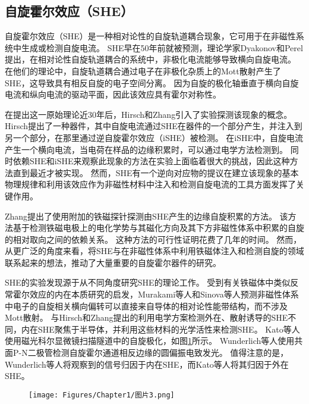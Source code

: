 \subsection{自旋霍尔效应（SHE）}
自旋霍尔效应（SHE）是一种相对论性的自旋轨道耦合现象，它可用于在非磁性系统中生成或检测自旋电流。
SHE早在50年前就被预测，理论学家Dyakonov\cite{dyakonov1971current}和Perel\cite{d1971possibility}提出，在相对论性自旋轨道耦合的系统中，非极化电流能够导致横向自旋电流。
在他们的理论中，自旋轨道耦合通过电子在非极化杂质上的Mott散射产生了SHE，这导致具有相反自旋的电子空间分离。
因为自旋的极化轴垂直于横向自旋电流和纵向电流的驱动平面，因此该效应具有霍尔对称性。\par
在提出这一原始理论近30年后，Hirsch\cite{hirsch1999spin}和Zhang\cite{zhang2000spin}引入了实验探测该现象的概念。
Hirsch提出了一种器件，其中自旋电流通过SHE在器件的一个部分产生，并注入到另一个部分，在那里通过逆自旋霍尔效应（iSHE）被检测。
在iSHE中，自旋电流产生一个横向电流，当电荷在样品的边缘积累时，可以通过电学方法检测到。
同时依赖SHE和iSHE来观察此现象的方法在实验上面临着很大的挑战，因此这种方法直到最近才被实现\cite{brune2010evidence}。
然而，SHE有一个逆向对应物的提议在建立该现象的基本物理规律和利用该效应作为非磁性材料中注入和检测自旋电流的工具方面发挥了关键作用。\par
Zhang提出了使用附加的铁磁探针探测由SHE产生的边缘自旋积累的方法。
该方法基于检测铁磁电极上的电化学势与其磁化方向及其下方非磁性体系中积累的自旋的相对取向之间的依赖关系。
这种方法的可行性证明花费了几年的时间。
然而，从更广泛的角度来看，将SHE与在非磁性体系中利用铁磁体注入和检测自旋的领域联系起来的想法，推动了大量重要的自旋霍尔器件的研究。\par
SHE的实验发现源于从不同角度研究SHE的理论工作。
受到有关铁磁体中类似反常霍尔效应的内在本质研究的启发，Murakami等人和Sinova等人预测非磁性体系中电子的自旋相关横向偏转可以直接来自导体的相对论性能带结构，而不涉及Mott散射。
与Hirsch和Zhang提出的利用电学方案检测外在、散射诱导的SHE不同，内在SHE聚焦于半导体，并利用这些材料的光学活性来检测SHE。
Kato等人使用磁光科尔显微镜扫描隧道中的自旋极化，如图\ref{图1.3}所示。
Wunderlich等人使用共面P-N二极管检测自旋霍尔通道相反边缘的圆偏振电致发光。
值得注意的是，Wunderlich等人将观察到的信号归因于内在SHE，而Kato等人将其归因于外在SHE。
\begin{figure}[h]
    \centering
    \texttt{[image: Figures/Chapter1/图片3.png]}
    \label{图1.3}
\end{figure}
